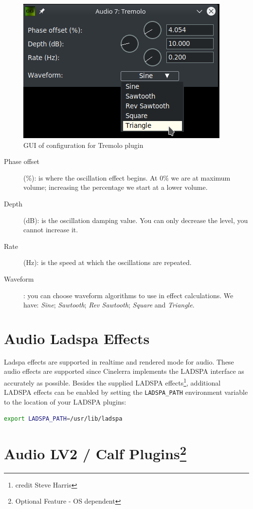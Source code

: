 \begin{figure}[htpb]
	\centering
	\includegraphics[width=0.5\linewidth]{images/tremolo.png}
	\caption{GUI of configuration for Tremolo plugin}
	\label{fig:tremolo}
\end{figure}

\begin{description}
	\item[Phase offset] (\%): is where the oscillation effect begins. At 0\% we are at maximum volume; increasing the percentage we start at a lower volume.
	\item[Depth] (dB): is the oscillation damping value. You can only decrease the level, you cannot increase it.
	\item[Rate] (Hz): is the speed at which the oscillations are repeated.
	\item[Waveform]: you can choose waveform algorithms to use in effect calculations. We have: \textit{Sine}; \textit{Sawtooth}; \textit{Rev Sawtooth}; \textit{Square} and \textit{Triangle}.
\end{description}

\section{Audio Ladspa Effects}%
\label{sec:audio_ladspa_effects}

Ladspa effects are supported in realtime and rendered mode for audio. These audio effects are supported since Cinelerra implements the LADSPA interface as accurately as possible. Besides the supplied LADSPA effects\protect\footnote{credit Steve Harris}, additional LADSPA effects can be enabled by setting the \texttt{LADSPA\_PATH} environment variable to the location of your LADSPA plugins:

\begin{lstlisting}[language=Bash,numbers=none]
export LADSPA_PATH=/usr/lib/ladspa
\end{lstlisting}

\section[Audio LV2 / Calf Plugins]{Audio LV2 / Calf Plugins\protect\footnote{Optional Feature - OS dependent}}%
\label{sec:audio_lv2_calf_plugins}

